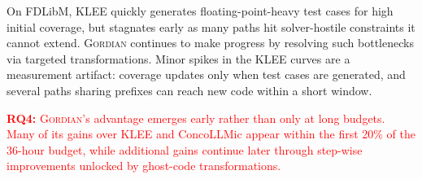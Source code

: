 \documentclass[acmsmall,screen,nonacm]{acmart}
\newcommand{\rev}[1]{\textcolor{red}{#1}}
\newcommand{\rev}[1]{#1}
\newenvironment{revblock}{\color{red}}{}
\newenvironment{revblock}{}{}
\newcommand{\projName}{\textsc{Gordian}\xspace}
\theoremstyle{definition}
\begin{document}
\begin{revblock}
On FDLibM, KLEE quickly generates floating-point-heavy test cases for high initial coverage, but stagnates early as many paths hit solver-hostile constraints it cannot extend. \projName{} continues to make progress by resolving such bottlenecks via targeted transformations. Minor spikes in the KLEE curves are a measurement artifact: coverage updates only when test cases are generated, and several paths sharing prefixes can reach new code within a short window.

\begin{tcolorbox}[colback=gray!5, colframe=black!20, arc=2pt, boxrule=0.3mm, breakable, sharp corners, left=2pt, right=2pt, top=2pt, bottom=2pt]
\rev{\textbf{RQ4:} \projName{}'s advantage emerges early rather than only at long budgets. Many of its gains over KLEE and ConcoLLMic appear within the first 20\% of the 36-hour budget, while additional gains continue later through step-wise improvements unlocked by ghost-code transformations.}
\end{tcolorbox}
\end{revblock}
\end{document}
